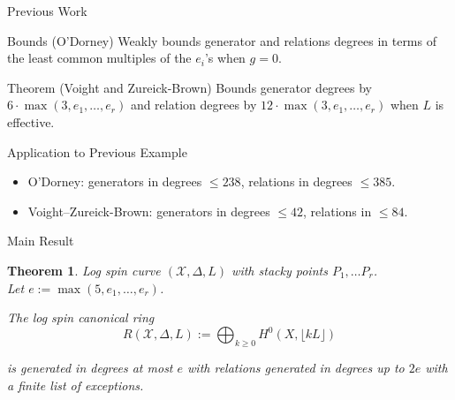 \documentclass{beamer}
\newtheorem{thm}{Theorem}
\theoremstyle{remark}
\newcommand \sx{{\mathscr X}}
\newcommand{\halfcan}{L}
\begin{document}

\begin{frame}{Previous Work}
\begin{block}{Bounds (O'Dorney)}
Weakly bounds generator and relations degrees in terms of
the least common multiples of the $e_i$'s when $g = 0$.
\end{block}

\begin{block}{Theorem (Voight and Zureick-Brown)}
Bounds generator degrees by $6
\cdot \max(3, e_1, \ldots, e_r)$ and relation degrees by $12 \cdot \max
(3, e_1, \ldots, e_ r)$ when $\halfcan$ is effective.
\end{block}

\begin{block}{Application to Previous Example}
\begin{itemize}
\item O'Dorney: generators in degrees $\leq 238$, relations in degrees $\leq 385$.
\item Voight--Zureick-Brown: generators in degrees $\leq 42$, relations in $\leq 84$.
\end{itemize}
\end{block}

\end{frame}


\begin{frame}{Main Result}
\begin{thm}
\label{thm:main}
Log spin curve $(\sx, \Delta, \halfcan)$ with stacky points $P_1, \ldots P_r$. \\
Let $e := \max(5, e_1, \ldots, e_r)$.

The log spin canonical ring 
\[
	R(\sx, \Delta, \halfcan) := \bigoplus_{k \geq 0} H^0(X, \lfloor k \halfcan \rfloor)
\]

\noindent
is generated in degrees at most $e$ with relations generated in
degrees up to $2e$ with a finite list of exceptions.
\end{thm}
\end{frame}

\end{document}
